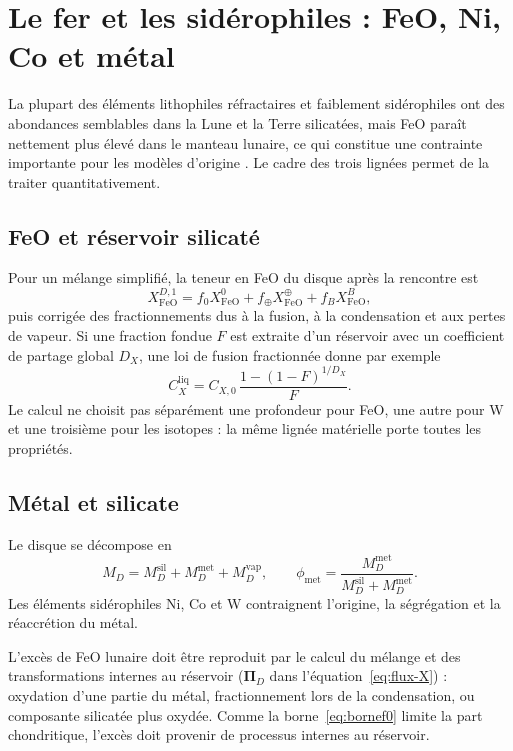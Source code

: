 \documentclass[11pt,a4paper,openany]{report}
\begin{document}
\section{Le fer et les sidérophiles : FeO, Ni, Co et métal}

La plupart des éléments lithophiles réfractaires et faiblement sidérophiles ont des abondances
semblables dans la Lune et la Terre silicatées, mais FeO paraît nettement plus élevé dans le
manteau lunaire, ce qui constitue une contrainte importante pour les modèles d'origine
\cite{Canup2023}. Le cadre des trois lignées permet de la traiter quantitativement.

\subsection{FeO et réservoir silicaté}

Pour un mélange simplifié, la teneur en FeO du disque après la rencontre est
\begin{equation}
X^{D,1}_{\mathrm{FeO}}=f_0X^{0}_{\mathrm{FeO}}+f_\oplus X^{\oplus}_{\mathrm{FeO}}+f_BX^{B}_{\mathrm{FeO}},
\label{eq:FeO}
\end{equation}
puis corrigée des fractionnements dus à la fusion, à la condensation et aux pertes de vapeur. Si
une fraction fondue $F$ est extraite d'un réservoir avec un coefficient de partage global $D_X$,
une loi de fusion fractionnée donne par exemple
\begin{equation}
C_X^{\mathrm{liq}}=C_{X,0}\,\frac{1-(1-F)^{1/D_X}}{F}.
\label{eq:fusion}
\end{equation}
Le calcul ne choisit pas séparément une profondeur pour FeO, une autre pour W et une troisième
pour les isotopes : la même lignée matérielle porte toutes les propriétés.

\subsection{Métal et silicate}

Le disque se décompose en
\begin{equation}
M_D=M_D^{\mathrm{sil}}+M_D^{\mathrm{met}}+M_D^{\mathrm{vap}},
\qquad
\phi_{\mathrm{met}}=\frac{M_D^{\mathrm{met}}}{M_D^{\mathrm{sil}}+M_D^{\mathrm{met}}}.
\label{eq:metal}
\end{equation}
Les éléments sidérophiles Ni, Co et W contraignent l'origine, la ségrégation et la réaccrétion
du métal.


\begin{consequence}
L'excès de FeO lunaire doit être reproduit par le calcul du mélange et des transformations
internes au réservoir ($\boldsymbol{\Pi}_D$ dans l'équation~\eqref{eq:flux-X}) : oxydation d'une partie
du métal, fractionnement lors de la condensation, ou composante silicatée plus oxydée. Comme la
borne~\eqref{eq:bornef0} limite la part chondritique, l'excès doit provenir de processus internes au
réservoir.
\end{consequence}
\end{document}
